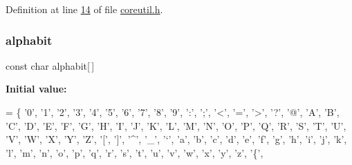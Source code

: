 Definition at line \hyperlink{a00023_source_l00014}{14} of file \hyperlink{a00023_source}{coreutil.\+h}.

\mbox{\label{a00023_a3ed7c4791ebe4cfc8d3a86ce87ad4b9f}} 
\subsubsection{\texorpdfstring{alphabit}{alphabit}}
{\footnotesize\ttfamily const char alphabit\mbox{[}$\,$\mbox{]}}

{\bfseries Initial value\+:}
\begin{DoxyCode}
= \{
    \textcolor{charliteral}{'0'}, \textcolor{charliteral}{'1'}, \textcolor{charliteral}{'2'}, \textcolor{charliteral}{'3'}, \textcolor{charliteral}{'4'}, \textcolor{charliteral}{'5'}, \textcolor{charliteral}{'6'}, \textcolor{charliteral}{'7'},  \textcolor{charliteral}{'8'}, \textcolor{charliteral}{'9'}, \textcolor{charliteral}{':'}, \textcolor{charliteral}{';'}, \textcolor{charliteral}{'<'}, \textcolor{charliteral}{'='}, \textcolor{charliteral}{'>'},
    \textcolor{charliteral}{'?'}, \textcolor{charliteral}{'@'}, \textcolor{charliteral}{'A'}, \textcolor{charliteral}{'B'}, \textcolor{charliteral}{'C'}, \textcolor{charliteral}{'D'}, \textcolor{charliteral}{'E'}, \textcolor{charliteral}{'F'},  \textcolor{charliteral}{'G'}, \textcolor{charliteral}{'H'}, \textcolor{charliteral}{'I'}, \textcolor{charliteral}{'J'}, \textcolor{charliteral}{'K'}, \textcolor{charliteral}{'L'}, \textcolor{charliteral}{'M'},
    \textcolor{charliteral}{'N'}, \textcolor{charliteral}{'O'}, \textcolor{charliteral}{'P'}, \textcolor{charliteral}{'Q'}, \textcolor{charliteral}{'R'}, \textcolor{charliteral}{'S'}, \textcolor{charliteral}{'T'}, \textcolor{charliteral}{'U'},  \textcolor{charliteral}{'V'}, \textcolor{charliteral}{'W'}, \textcolor{charliteral}{'X'}, \textcolor{charliteral}{'Y'}, \textcolor{charliteral}{'Z'}, \textcolor{charliteral}{'['}, \textcolor{charliteral}{']'},
    \textcolor{charliteral}{'^'}, \textcolor{charliteral}{'\_'}, \textcolor{charliteral}{'`'}, \textcolor{charliteral}{'a'}, \textcolor{charliteral}{'b'}, \textcolor{charliteral}{'c'}, \textcolor{charliteral}{'d'}, \textcolor{charliteral}{'e'},  \textcolor{charliteral}{'f'}, \textcolor{charliteral}{'g'}, \textcolor{charliteral}{'h'}, \textcolor{charliteral}{'i'}, \textcolor{charliteral}{'j'}, \textcolor{charliteral}{'k'}, \textcolor{charliteral}{'l'},
    \textcolor{charliteral}{'m'}, \textcolor{charliteral}{'n'}, \textcolor{charliteral}{'o'}, \textcolor{charliteral}{'p'}, \textcolor{charliteral}{'q'}, \textcolor{charliteral}{'r'}, \textcolor{charliteral}{'s'}, \textcolor{charliteral}{'t'},  \textcolor{charliteral}{'u'}, \textcolor{charliteral}{'v'}, \textcolor{charliteral}{'w'}, \textcolor{charliteral}{'x'}, \textcolor{charliteral}{'y'}, \textcolor{charliteral}{'z'}, \textcolor{charliteral}{'\{'},

\end{DoxyCode}
